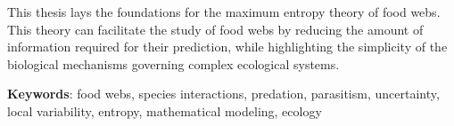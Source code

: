 \documentclass[12pt,twoside,phd]{dms}
\numberwithin{equation}{section}
\numberwithin{table}{chapter}
\numberwithin{figure}{chapter}
\begin{document}
This thesis lays the foundations for the maximum entropy theory of food webs.
This theory can facilitate the study of food webs by reducing the amount of
information required for their prediction, while highlighting the simplicity of
the biological mechanisms governing complex ecological systems.

\textbf{Keywords}: food webs, species interactions, predation, parasitism,
uncertainty, local variability, entropy, mathematical modeling, ecology


\francais
\cleardoublepage
{}  %

\setlength{\parskip}{0pt} %

\tableofcontents
\cleardoublepage
{}  %
\listoftables
\cleardoublepage
{}
\listoffigures


\end{document}
